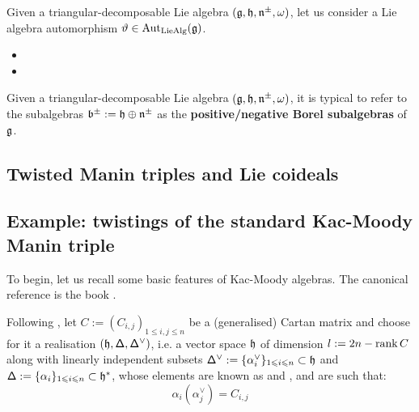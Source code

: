         \begin{definition} \label{def: automorphisms_of_types_I_and_II}
            Given a triangular-decomposable Lie algebra $(\mathfrak{g}, \mathfrak{h}, \mathfrak{n}^{\pm}, \omega)$, let us consider a Lie algebra automorphism $\vartheta \in \operatorname{Aut}_{\mathrm{Lie}\mathrm{Alg}}(\mathfrak{g})$. 
            \begin{itemize}
                \item 
                \item 
            \end{itemize}
        \end{definition}
        \begin{remark}
            Given a triangular-decomposable Lie algebra $(\mathfrak{g}, \mathfrak{h}, \mathfrak{n}^{\pm}, \omega)$, it is typical to refer to the subalgebras $\mathfrak{b}^{\pm} := \mathfrak{h} \oplus \mathfrak{n}^{\pm}$ as the \textbf{positive/negative Borel subalgebras} of $\mathfrak{g}$. 
        \end{remark}

    \subsection{Twisted Manin triples and Lie coideals}

    \subsection{Example: twistings of the standard Kac-Moody Manin triple}
        To begin, let us recall some basic features of Kac-Moody algebras. The canonical reference is the book \cite{kac_infinite_dimensional_lie_algebras}.
        
        Following \cite[Chapter 1]{kac_infinite_dimensional_lie_algebras}, let $C := ( C_{i, j} )_{1 \leq i, j \leq n}$ be a (generalised) Cartan matrix and choose for it a realisation $(\mathfrak{h}, \mathsf{\Delta}, \mathsf{\Delta}^{\vee})$, i.e. a vector space $\mathfrak{h}$ of dimension $l := 2n - \operatorname{rank} C$ along with linearly independent subsets $\mathsf{\Delta}^{\vee} := \{ \alpha_i^{\vee} \}_{1 \leqslant i \leqslant n} \subset \mathfrak{h}$ and $\mathsf{\Delta} := \{ \alpha_i \}_{1 \leqslant i \leqslant n} \subset \mathfrak{h}^*$, whose elements are known as  and , and are such that:
            \begin{equation} \label{equation: cartan_matrix_entries}
                \alpha_i( \alpha_j^{\vee} ) = C_{i, j}
            \end{equation}

